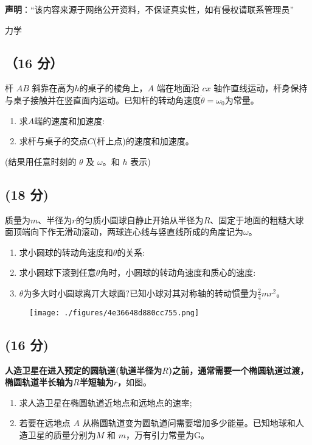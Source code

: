 
\textbf{声明}：“该内容来源于网络公开资料，不保证真实性，如有侵权请联系管理员”

力学
\subsection{（16 分）}
杆 $AB$ 斜靠在高为$h$的桌子的棱角上，$A$ 端在地面沿 $cx$ 轴作直线运动，杆身保持与桌子接触并在竖直面内运动。已知杆的转动角速度$\dot{\theta}=\omega_{0}$为常量。
\begin{enumerate}
\item 求$A$端的速度和加速度:
\item 求杆与桌子的交点$C$(杆上点)的速度和加速度。
\end{enumerate}
(结果用任意时刻的 $\theta$ 及 $\omega$。和 $h$ 表示)
\subsection{(18 分)}
质量为$m$、半径为$r$的匀质小圆球自静止开始从半径为$R$、固定于地面的粗糙大球面顶端向下作无滑动滚动，两球连心线与竖直线所成的角度记为$\omega$。
\begin{enumerate}
\item 求小圆球的转动角速度和$\theta$的关系:
\item 求小圆球下滚到任意$\theta$角时，小圆球的转动角速度和质心的速度:
\item $\theta$为多大时小圆球离丌大球面?已知小球对其对称轴的转动惯量为$\frac{2}{4}mr^2$。
\end{enumerate}
\begin{figure}[ht]
\centering
\texttt{[image: ./figures/4e36648d880cc755.png]}
\caption{} \label{fig_PKU004_1}
\end{figure}
\subsection{(16 分) }
\textbf{人造卫星在进入预定的圆轨道(轨道半径为$R$)之前，通常需要一个椭圆轨道过渡，椭圆轨道半长轴为$R$半短轴为$r$，}如图。
\begin{enumerate}
\item 求人造卫星在椭圆轨道近地点和远地点的速率;
\item 若要在远地点 $A$ 从椭圆轨道变为圆轨道问需要增加多少能量。已知地球和人造卫星的质量分别为$M$ 和 $m$，万有引力常量为G。
\end{enumerate}
